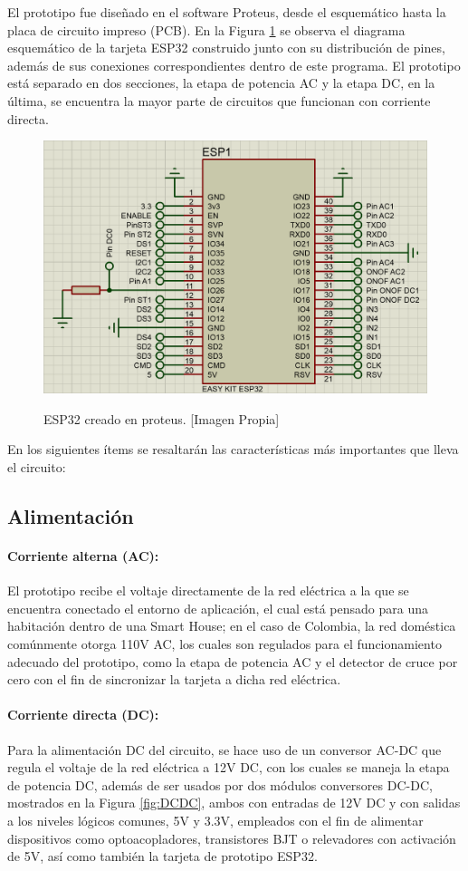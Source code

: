 El prototipo fue diseñado en el software Proteus, desde el esquemático hasta la placa de circuito impreso (PCB). En la Figura \ref{fig:esp32} se observa el diagrama esquemático de la tarjeta ESP32 construido junto con su distribución de pines, además de sus conexiones correspondientes dentro de este programa. El prototipo está separado en dos secciones, la etapa de potencia AC y la etapa DC, en la última, se encuentra la mayor parte de circuitos que funcionan con corriente directa.\\

\begin{figure}[H]
	\centering
	\caption[ESP32 creado en proteus.]{ESP32 creado en proteus. [Imagen Propia]}
	\includegraphics[width=0.5\linewidth]{Imagenes/ESP32}	
	\label{fig:esp32}
\end{figure}

En los siguientes ítems se resaltarán las características más importantes que lleva el circuito:\\

	\subsection{Alimentación}
	
	\paragraph{Corriente alterna (AC):}
		El prototipo recibe el voltaje directamente de la red eléctrica a la que se encuentra conectado el entorno de aplicación, el cual está pensado para una habitación dentro de una Smart House; en el caso de Colombia, la red doméstica comúnmente otorga 110V AC, los cuales son regulados para el funcionamiento adecuado del prototipo, como la etapa de potencia AC y el detector de cruce por cero con el fin de sincronizar la tarjeta a dicha red eléctrica.\\
		
	\paragraph{Corriente directa (DC):}
		Para la alimentación DC del circuito, se hace uso de un conversor AC-DC que regula el voltaje de la red eléctrica a 12V DC, con los cuales se maneja la etapa de potencia DC, además de ser usados por dos módulos conversores DC-DC, mostrados en la Figura \ref{fig:DCDC}, ambos con entradas de 12V DC y con salidas a los niveles lógicos comunes, 5V y 3.3V, empleados con el fin de alimentar dispositivos como optoacopladores, transistores BJT o relevadores con activación de 5V, así como también la tarjeta de prototipo ESP32.\\
		
